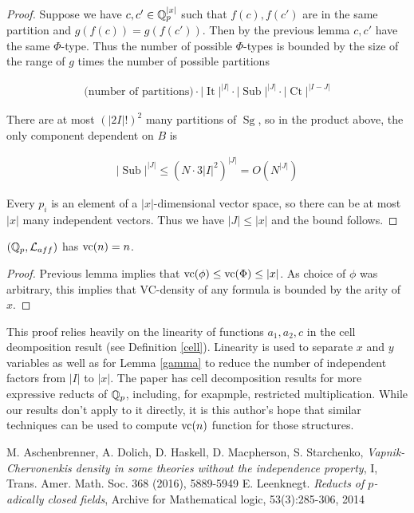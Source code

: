 \documentclass{amsart}
\renewcommand{\LL}{\mathcal L}
\newcommand{\paren}[1]{\left(#1\right)}
\DeclareMathOperator{\Sg}{Sg}
\DeclareMathOperator{\It}{It}
\DeclareMathOperator{\Sub}{Sub}
\DeclareMathOperator{\Ct}{Ct}
\begin{document}
\begin{proof}
  Suppose we have $c, c' \in \mathbb{Q}_p^{|x|}$ such that $f(c), f(c')$ are in the same partition and $g(f(c)) = g(f(c'))$.
  Then by the previous lemma $c, c'$ have the same $\Phi$-type.
  Thus the number of possible $\Phi$-types is bounded by the size of the range of $g$ times the number of possible partitions
  
  \begin{align*}
    \text{(number of partitions)} \cdot |\It|^{|I|} \cdot |\Sub|^{|J|} \cdot |\Ct|^{|I-J|}
  \end{align*}

  There are at most $\paren{|2I|!}^2$ many partitions of $\Sg$,
  so in the product above, the only component dependent on $B$ is

  \begin{align*}
    |\Sub|^{|J|} \leq (N \cdot 3{|I|}^2)^{|J|} = O(N^{|J|})
  \end{align*}	
  
  Every $p_i$ is an element of a $|x|$-dimensional vector space, so there can be at most $|x|$ many independent vectors.
  Thus we have $|J| \leq |x|$ and the bound follows.
\end{proof}

\begin{Corollary} 
  $(\Q_p, \LL_{aff})$ has $\operatorname{vc}(n) = n$.
\end{Corollary}

\begin{proof}
  Previous lemma implies that $\operatorname{vc}(\phi) \leq \operatorname{vc}(\Phi) \leq |x|$.
  As choice of $\phi$ was arbitrary, this implies that VC-density of any formula is bounded by the arity of $x$.
\end{proof}

This proof relies heavily on the linearity of functions $a_1, a_2, c$ in the cell deomposition result (see Definition \ref{cell}).
Linearity is used to separate $x$ and $y$ variables as well as
for Lemma \ref{gamma} to reduce the number of independent factors from $|I|$ to $|x|$.
The paper \cite{reduct} has cell decomposition results for more expressive reducts of $\mathbb{Q}_p$,
including, for exapmple, restricted multiplication.
While our results don't apply to it directly,
it is this author's hope that similar techniques can be used to compute $\operatorname{vc}(n)$ function for those structures.

\begin{thebibliography}{9}
  M. Aschenbrenner, A. Dolich, D. Haskell, D. Macpherson, S. Starchenko,
  \textit{Vapnik-Chervonenkis density in some theories without the independence property}, I,
  Trans. Amer. Math. Soc. 368 (2016), 5889-5949
  E. Leenknegt. \textit{Reducts of $p$-adically closed fields}, Archive for Mathematical logic, 53(3):285-306, 2014
\end{thebibliography}
\end{document}
